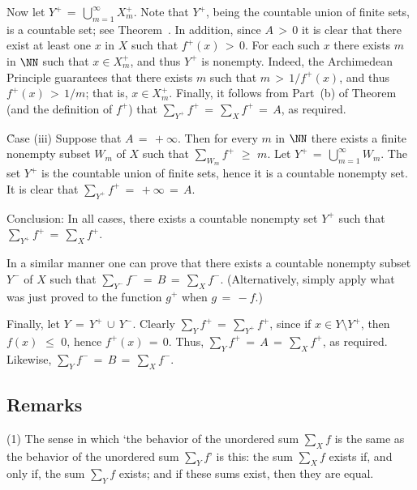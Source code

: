         Now let $Y^{+} \,=\, {\bigcup}_{m=1}^{{\infty}} X^{+}_{m}$. Note that $Y^{+}$, being the countable union of finite sets,
    is a countable set; see Theorem~.
    In addition, since $A\,>\,0$ it is clear that there exist at least one $x$ in $X$ such that $f^{+}(x)\,>\,0$. For each such $x$ there exists $m$ in ${\NN}$ such that $x{\in}X^{+}_{m}$, and thus $Y^{+}$ is nonempty.
    Indeed, the Archimedean Principle guarantees that there exists $m$ such that $m\,>\,1/f^{+}(x)$, and thus $f^{+}(x)\,>\,1/m$; that is, $x{\in}X^{+}_{m}$.
    Finally, it follows from Part~(b) of Theorem~ (and the definition of $f^{+}$) that ${\sum}_{Y^{+}} f^{+} \,=\, {\sum}_{X} f^{+} \,=\, A$, as required.

        \h Case (iii) Suppose that $A \,=\, +{\infty}$. Then for every $m$ in ${\NN}$ there exists a finite nonempty subset $W_{m}$ of $X$  such that ${\sum}_{W_{m}} f^{+}\,\,{\geq}\,\,m$.
    Let $Y^{+} \,=\, {\bigcup}_{m=1}^{{\infty}} W_{m}$. The set $Y^{+}$ is the countable union of finite sets, hence it is a countable nonempty set.
    It is clear that ${\sum}_{Y^{+}} f^{+} \,=\, +{\infty} \,=\, A$.

        Conclusion: In all cases, there exists a countable nonempty set $Y^{+}$ such that ${\sum}_{Y^{+}} f^{+} \,=\, {\sum}_{X} f^{+}$.

        In a similar manner one can prove that there exists a countable nonempty subset $Y^{-}$ of $X$ such that ${\sum}_{Y^{-}} f^{-} \,=\, B \,=\, {\sum}_{X} f^{-}$.
    (Alternatively, simply apply what was just proved to the function $g^{+}$ when $g \,=\, -f$.)

        Finally, let $Y \,=\, Y^{+}\,{\cup}\,Y^{-}$. Clearly ${\sum}_{Y} f^{+} \,=\, {\sum}_{Y^{+}} f^{+}$,
    since if $x{\in}Y{\setminus}Y^{+}$, then $f(x)\,\,{\leq}\,\,0$, hence $f^{+}(x) \,=\, 0$.
    Thus, ${\sum}_{Y} f^{+} \,=\, A \,=\, {\sum}_{X} f^{+}$, as required.
    Likewise, ${\sum}_{Y} f^{-} \,=\, B \,=\, {\sum}_{X} f^{-}$.

\V

            \subsection{\small{\bf Remarks}}
            \label{RemrkG20.110}

\V

\hspace*{\parindent}
        (1) The sense in which `the behavior of the unordered sum ${\sum}_{X} f$ is the same as the behavior of the unordered sum ${\sum}_{Y} f$' is this:
    the sum ${\sum}_{X} f$ exists if, and only if, the sum ${\sum}_{Y} f$ exists;
    and if these sums exist, then they are equal.


